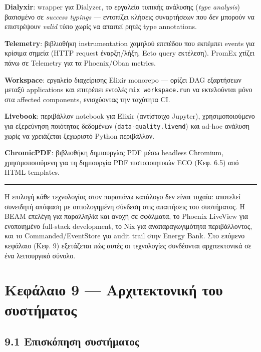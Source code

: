 \textbf{Dialyxir}: wrapper για Dialyzer, το εργαλείο τυπικής ανάλυσης
(\emph{type analysis}) βασισμένο σε \emph{success typings} --- εντοπίζει
κλήσεις συναρτήσεων που δεν μπορούν να επιστρέψουν \emph{valid} τύπο
χωρίς να απαιτεί ρητές type annotations.

\textbf{Telemetry}: βιβλιοθήκη instrumentation χαμηλού επιπέδου που
εκπέμπει events για κρίσιμα σημεία (HTTP request έναρξη/λήξη, Ecto query
εκτέλεση). PromEx χτίζει πάνω σε Telemetry για τα Phoenix/Oban metrics.

\textbf{Workspace}: εργαλείο διαχείρισης Elixir monorepo --- ορίζει DAG
εξαρτήσεων μεταξύ applications και επιτρέπει εντολές
\texttt{mix\ workspace.run} να εκτελούνται μόνο στα affected components,
ενισχύοντας την ταχύτητα CI.

\textbf{Livebook}: περιβάλλον notebook για Elixir (αντίστοιχο Jupyter),
χρησιμοποιούμενο για εξερεύνηση ποιότητας δεδομένων
(\texttt{data-quality.livemd}) και ad-hoc ανάλυση χωρίς να χρειάζεται
ξεχωριστό Python περιβάλλον.

\textbf{ChromicPDF}: βιβλιοθήκη δημιουργίας PDF μέσω headless Chromium,
χρησιμοποιούμενη για τη δημιουργία PDF πιστοποιητικών ECO (Κεφ. 6.5) από
HTML templates.

\begin{center}\rule{0.5\linewidth}{0.5pt}\end{center}

Η επιλογή κάθε τεχνολογίας στον παραπάνω κατάλογο δεν είναι τυχαία:
αποτελεί συνειδητή απόφαση με αιτιολογημένη σύνδεση στις απαιτήσεις του
συστήματος. Η BEAM επελέγη για παραλληλία και ανοχή σε σφάλματα, το
Phoenix LiveView για ενοποιημένο full-stack development, το Nix για
αναπαραγωγιμότητα περιβάλλοντος, και το Commanded/EventStore για audit
trail στην Energy Bank. Στο επόμενο κεφάλαιο (Κεφ. 9) εξετάζεται πώς
αυτές οι τεχνολογίες συνδέονται αρχιτεκτονικά σε ένα λειτουργικό σύνολο.

\pagebreak

\chapter{Κεφάλαιο 9 --- Αρχιτεκτονική του
συστήματος}\label{ux3baux3b5ux3c6ux3acux3bbux3b1ux3b9ux3bf-9-ux3b1ux3c1ux3c7ux3b9ux3c4ux3b5ux3baux3c4ux3bfux3bdux3b9ux3baux3ae-ux3c4ux3bfux3c5-ux3c3ux3c5ux3c3ux3c4ux3aeux3bcux3b1ux3c4ux3bfux3c2}

\section{9.1 Επισκόπηση
συστήματος}\label{ux3b5ux3c0ux3b9ux3c3ux3baux3ccux3c0ux3b7ux3c3ux3b7-ux3c3ux3c5ux3c3ux3c4ux3aeux3bcux3b1ux3c4ux3bfux3c2}

